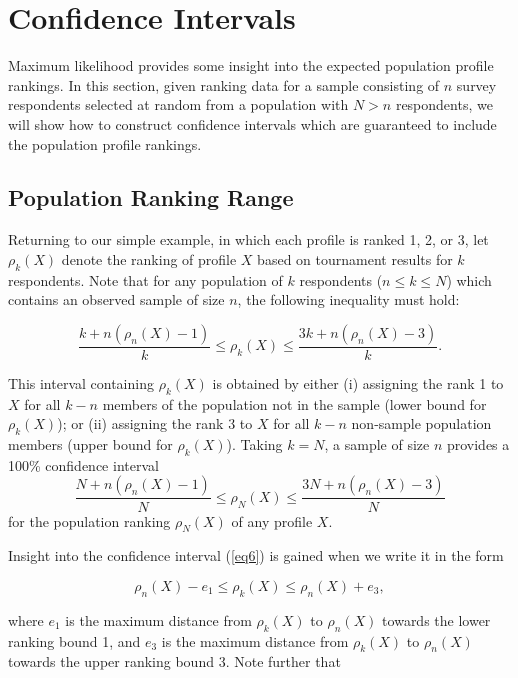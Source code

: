 \documentclass[a4paper, 12pt]{article}
\begin{document}
\section{Confidence Intervals}

Maximum likelihood  provides some insight into the expected population profile rankings. In this section, given ranking data for a sample consisting of $n$ survey respondents selected at random from a population with $N> n$ respondents, we will show how to construct confidence  intervals   which are guaranteed to include the population profile rankings.   

\subsection{Population Ranking Range}

Returning to our simple example, in which each profile is ranked 1, 2, or 3, let $\rho_k(X)$ denote the ranking of profile $X$ based on tournament results for $k$ respondents. Note that for any population of $k$ respondents ($n\le k \le N$) which contains an observed sample of size $n$, the following inequality must hold:

\begin{equation}
\frac{k+n(\rho_n(X)-1)}{k}\le \rho_k(X)  \le \frac{3k+n(\rho_n(X)-3)}{k}.
\label{eq6}
\end{equation}

{\flushleft This} interval containing $\rho_k(X) $ is obtained by either (i) assigning the  rank 1 to $X$ for all $k-n$ members of the population not in the sample (lower bound for $\rho_k(X)$); or (ii) assigning the rank 3 to $X$  for all $k-n$ non-sample population members (upper bound for $\rho_k(X)$). Taking $k=N$, a sample of size $n$ provides  a 100\% confidence interval $$\frac{N+n(\rho_n(X)-1)}{N}\le \rho_N(X)  \le \frac{3N+n(\rho_n(X)-3)}{N}$$ for the population ranking $\rho_N(X)$ of any profile $X$.

Insight into the confidence interval (\ref{eq6}) is gained when we write it in the form

\begin{equation}
\rho_n(X)-e_1 \le \rho_k(X) \le \rho_n(X)+e_3,
\end{equation}
\label{eq:9}

{\flushleft where} $e_1$ is the maximum distance from $\rho_k(X)$ to $\rho_n(X)$ towards the lower ranking bound 1, and $e_3$ is the maximum distance  from $\rho_k(X)$ to $\rho_n(X)$ towards the upper ranking bound 3. Note further that
\end{document}
